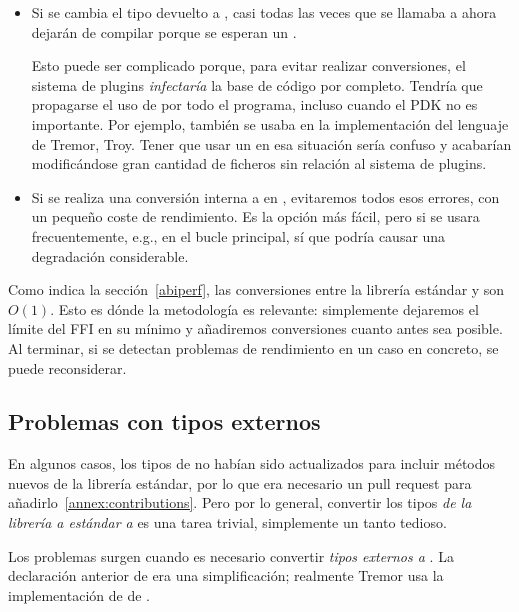 \begin{itemize}
    \item Si se cambia el tipo devuelto a , casi todas las veces
        que se llamaba a  ahora dejarán de compilar porque se
        esperan un .

        Esto puede ser complicado porque, para evitar realizar conversiones, el
        sistema de plugins \emph{infectaría} la base de código por completo.
        Tendría que propagarse el uso de  por todo el programa,
        incluso cuando el PDK no es importante. Por ejemplo, 
        también se usaba en la implementación del lenguaje de Tremor, Troy.
        Tener que usar un  en esa situación sería confuso y
        acabarían modificándose gran cantidad de ficheros sin relación al
        sistema de plugins.

    \item Si se realiza una conversión interna a  en
        , evitaremos todos esos errores, con un pequeño coste de
        rendimiento. Es la opción más fácil, pero si  se
        usara frecuentemente, e.g., en el bucle principal, sí que podría causar
        una degradación considerable.
\end{itemize}

Como indica la sección~\ref{abiperf}, las conversiones entre la librería
estándar y \abistable son $O(1)$. Esto es dónde la metodología \work es
relevante: simplemente dejaremos el límite del FFI en su mínimo y añadiremos
conversiones cuanto antes sea posible. Al terminar, si se detectan problemas de
rendimiento en un caso en concreto, se puede reconsiderar.

\subsection{Problemas con tipos externos}

En algunos casos, los tipos de \abistable no habían sido actualizados para
incluir métodos nuevos de la librería estándar, por lo que era necesario un pull
request para añadirlo~\ref{annex:contributions}. Pero por lo general, convertir
los tipos \emph{de la librería a estándar a \abistable} es una tarea trivial,
simplemente un tanto tedioso.

Los problemas surgen cuando es necesario convertir \emph{tipos externos a
\abistable}. La declaración anterior de  era una simplificación;
realmente Tremor usa la implementación de  de
.

